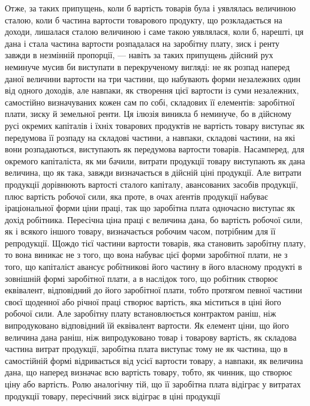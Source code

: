 
Отже, за таких припущень, коли б вартість товарів була і уявлялась величиною
сталою, коли б частина вартости товарового продукту, що розкладається
на доходи, лишалася сталою величиною і саме такою уявлялася, коли б, нарешті,
ця дана і стала частина вартости розпадалася на заробітну плату, зиск і ренту
завжди в незмінній пропорції, — навіть за таких припущень дійсний рух неминуче
мусив би виступати в перекрученому вигляді: не як розпад наперед даної
величини вартости на три частини, що набувають форми незалежних один від
одного доходів, але навпаки, як створення цієї вартости із суми незалежних,
самостійно визначуваних кожен сам по собі, складових її елементів: заробітної
плати, зиску й земельної ренти. Ця ілюзія виникла б неминуче, бо в дійсному
русі окремих капіталів і їхніх товарових продуктів не вартість товару виступає
як передумова її розпаду на складові частини, а навпаки, складові частини, на які
вони розпадаються, виступають як передумова вартости товарів. Насамперед, для
окремого капіталіста, як ми бачили, витрати продукції товару виступають
як дана величина, що як така, завжди визначається в дійсній ціні продукції.
Але витрати продукції дорівнюють вартості сталого капіталу, авансованих засобів
продукції, плюс вартість робочої сили, яка проте, в очах аґентів продукції набуває
іраціональної форми ціни праці, так що заробітна плата одночасно виступає
як дохід робітника. Пересічна ціна праці є величина дана, бо вартість робочої
сили, як і всякого іншого товару, визначається робочим часом, потрібним
для її репродукції. Щождо тієї частини вартости товарів, яка становить заробітну
плату, то вона виникає не з того, що вона набуває цієї форми заробітної плати,
не з того, що капіталіст авансує робітникові його частину в його власному
продукті в зовнішній формі заробітної плати, а в наслідок того, що робітник
створює еквівалент, відповідний до його заробітної плати, тобто протягом певної
частини своєї щоденної або річної праці створює вартість, яка міститься в ціні
його робочої сили. Але заробітну плату встановлюється контрактом раніш, ніж
випродуковано відповідний їй еквівалент вартости. Як елемент ціни, що його
величина дана раніш, ніж випродуковано товар і товарову вартість, як складова
частина витрат продукції, заробітна плата виступає тому не як частина,
що в самостійній формі відривається від усієї вартости товару, а навпаки, як
величина дана, що наперед визначає всю вартість товару, тобто, як чинник,
що створює ціну або вартість. Ролю аналогічну тій, що її заробітна плата
відіграє у витратах продукції товару, пересічний зиск відіграє в ціні продукції
